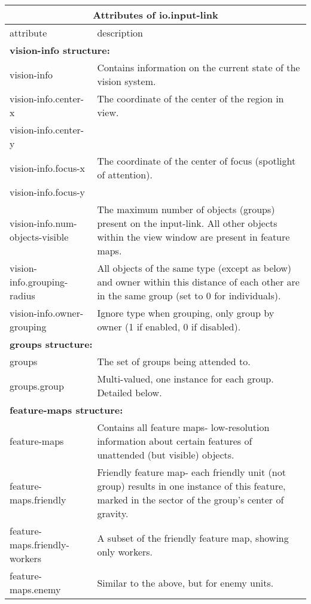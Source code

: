 \begin{center}
\begin{tabular}{|l|p{4.0in}|}
\hline
\multicolumn{2}{|c|}{\textbf{Attributes of io.input-link}}\\ 
\hline
attribute  &  description\\
\hline \hline
\multicolumn{2}{|l|}{\textbf{vision-info structure:}}\\ 
\hline
vision-info & Contains information on the current state of the vision system. \\
\hline
vision-info.center-x & The coordinate of the center of the region in view. \\
vision-info.center-y & \\
\hline
vision-info.focus-x & The coordinate of the center of focus (spotlight of attention). \\
vision-info.focus-y & \\
\hline
vision-info.num-objects-visible & The maximum number of objects (groups) present on the input-link. All other objects within the view window are present in feature maps. \\
\hline
vision-info.grouping-radius & All objects of the same type (except as below) and owner within this distance of each other are in the same group (set to 0 for individuals). \\
\hline
vision-info.owner-grouping & Ignore type when grouping, only group by owner (1 if enabled, 0 if disabled). \\
\hline
\multicolumn{2}{|l|}{\textbf{groups structure:}}\\ 
\hline
groups & The set of groups being attended to. \\
\hline
groups.group & Multi-valued, one instance for each group. Detailed below. \\
\hline
\multicolumn{2}{|l|}{\textbf{feature-maps structure:}}\\ 
\hline
feature-maps & Contains all feature maps- low-resolution information about certain features of unattended (but visible) objects. \\
\hline
feature-maps.friendly & Friendly feature map- each friendly unit (not group) results in one instance of this feature, marked in the sector of the group's center of gravity. \\
\hline
feature-maps.friendly-workers & A subset of the friendly feature map, showing only workers.\\
\hline
feature-maps.enemy & Similar to the above, but for enemy units.\\

\end{tabular}
\end{center}
